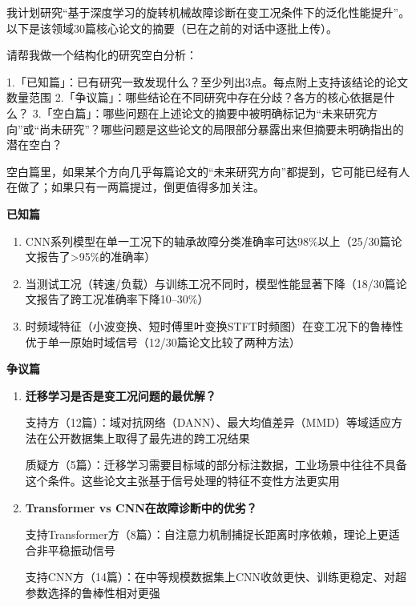 \begin{userbox}
我计划研究``基于深度学习的旋转机械故障诊断在变工况条件下的泛化性能提升''。以下是该领域30篇核心论文的摘要（已在之前的对话中逐批上传）。

请帮我做一个结构化的研究空白分析：

1.「已知篇」：已有研究一致发现什么？至少列出3点。每点附上支持该结论的论文数量范围
2.「争议篇」：哪些结论在不同研究中存在分歧？各方的核心依据是什么？
3.「空白篇」：哪些问题在上述论文的摘要中被明确标记为``未来研究方向''或``尚未研究''？哪些问题是这些论文的局限部分暴露出来但摘要未明确指出的潜在空白？

空白篇里，如果某个方向几乎每篇论文的``未来研究方向''都提到，它可能已经有人在做了；如果只有一两篇提过，倒更值得多加关注。
\end{userbox}

\begin{aibox}
\textbf{已知篇}

\begin{enumerate}[nosep,leftmargin=*]
\item CNN系列模型在单一工况下的轴承故障分类准确率可达98\%以上（25/30篇论文报告了>95\%的准确率）
\item 当测试工况（转速/负载）与训练工况不同时，模型性能显著下降（18/30篇论文报告了跨工况准确率下降10--30\%）
\item 时频域特征（小波变换、短时傅里叶变换STFT时频图）在变工况下的鲁棒性优于单一原始时域信号（12/30篇论文比较了两种方法）
\end{enumerate}

\smallskip
\textbf{争议篇}

\begin{enumerate}[nosep,leftmargin=*]
\item \textbf{迁移学习是否是变工况问题的最优解？}

支持方（12篇）：域对抗网络（DANN）、最大均值差异（MMD）等域适应方法在公开数据集上取得了最先进的跨工况结果

质疑方（5篇）：迁移学习需要目标域的部分标注数据，工业场景中往往不具备这个条件。这些论文主张基于信号处理的特征不变性方法更实用

\item \textbf{Transformer vs CNN在故障诊断中的优劣？}

支持Transformer方（8篇）：自注意力机制捕捉长距离时序依赖，理论上更适合非平稳振动信号

支持CNN方（14篇）：在中等规模数据集上CNN收敛更快、训练更稳定、对超参数选择的鲁棒性相对更强
\end{enumerate}


\end{aibox}
